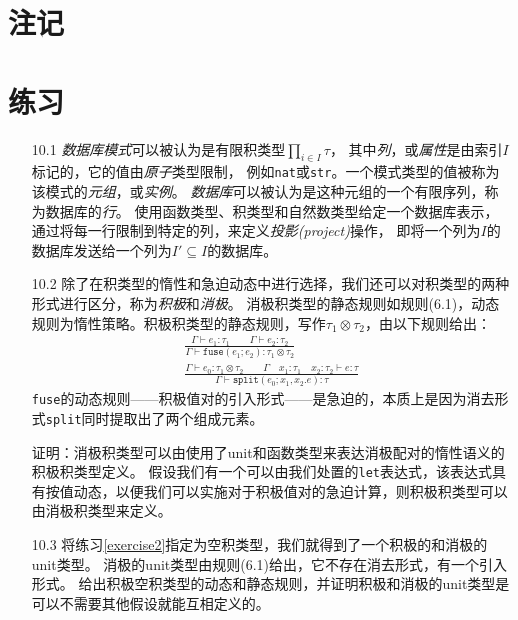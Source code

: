 \section{注记}


\section*{练习}
\begin{itemize}
\item[10.1] \textit{数据库模式}可以被认为是有限积类型$\prod_{i\in I}\tau$，
其中\textit{列}，或\textit{属性}是由索引$I$标记的，它的值由\textit{原子}类型限制，
例如\texttt{nat}或\texttt{str}。一个模式类型的值被称为该模式的\textit{元组}，或\textit{实例}。
\textit{数据库}可以被认为是这种元组的一个有限序列，称为数据库的\textit{行}。
使用函数类型、积类型和自然数类型给定一个数据库表示，通过将每一行限制到特定的列，来定义\textit{投影(project)}操作，
即将一个列为$I$的数据库发送给一个列为$I'\subseteq I$的数据库。

\label{exercise2}\item[10.2] 除了在积类型的惰性和急迫动态中进行选择，我们还可以对积类型的两种形式进行区分，称为\textit{积极}和\textit{消极}。
消极积类型的静态规则如规则(6.1)，动态规则为惰性策略。积极积类型的静态规则，写作$\tau_1 \otimes \tau_2$，由以下规则给出：
\begin{subequations}
    \begin{gather}
    \frac{\Gamma \vdash e_1 : \tau_1 \qquad \Gamma \vdash e_2 : \tau_2}
    {\Gamma \vdash \mathtt{fuse}(e_1;e_2):\tau_1 \otimes \tau_2} \\
    \frac{\Gamma \vdash e_0:\tau_1\otimes\tau_2\qquad\Gamma\quad x_1:\tau_1\quad x_2:\tau_2\vdash e:\tau}
    {\Gamma\vdash \mathtt{split}(e_0;x_1,x_2 .e):\tau}
    \end{gather}
\end{subequations}
\texttt{fuse}的动态规则——积极值对的引入形式——是急迫的，本质上是因为消去形式\texttt{split}同时提取出了两个组成元素。

证明：消极积类型可以由使用了unit和函数类型来表达消极配对的惰性语义的积极积类型定义。
假设我们有一个可以由我们处置的\texttt{let}表达式，该表达式具有按值动态，以便我们可以实施对于积极值对的急迫计算，则积极积类型可以由消极积类型来定义。

\item[10.3] 将练习\ref{exercise2}指定为空积类型，我们就得到了一个积极的和消极的unit类型。
消极的unit类型由规则(6.1)给出，它不存在消去形式，有一个引入形式。
给出积极空积类型的动态和静态规则，并证明积极和消极的unit类型是可以不需要其他假设就能互相定义的。
\end{itemize}

